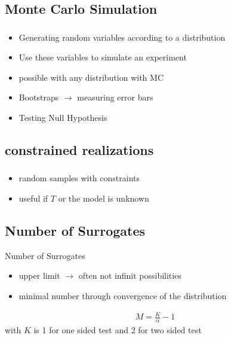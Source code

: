 \subsection{Monte Carlo Simulation}
\begin{frame}
  \frametitle{\insertsectionhead}
  \framesubtitle{\insertsubsectionhead}
\begin{itemize}
  \item Generating random variables according to a distribution
  \item Use these variables to simulate an experiment 
  \item possible with any distribution with MC 
  \item Bootstraps $\rightarrow$ measuring error bars 
  \item Testing Null Hypothesis
\end{itemize}
\end{frame}


\subsection{constrained realizations}
\begin{frame}
  \frametitle{\insertsectionhead}
  \framesubtitle{\insertsubsectionhead}
\begin{itemize}
  \item random samples with constraints
  \item useful if $T$ or the model is unknown 
\end{itemize}
\subsection{Number of Surrogates}
Number of Surrogates
\begin{itemize}
  \item upper limit $\rightarrow$ often not infinit possibilities
  \item minimal number through convergence of the distribution
\end{itemize}
\begin{gather}
  M = \frac{K}{\alpha}-1
\end{gather}
with $K$ is 1 for one sided test and 2 for two sided test \cite{LANCASTER20181}
\end{frame}

